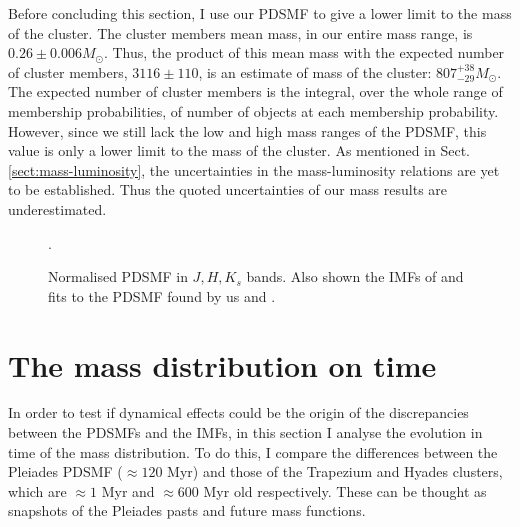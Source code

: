 Before concluding this section, I use our PDSMF to give a lower limit to the mass of the cluster. The cluster members mean mass, in our entire mass range, is $0.26 \pm 0.006 M_{\odot}$. Thus, the product of this mean mass with the expected number of cluster members, $3116 \pm 110$, is an estimate of mass of the cluster: $807^{+38}_{-29} M_{\odot}$. The expected number of cluster members is the integral, over the whole range of membership probabilities, of number of objects at each membership probability. However, since we still lack the low and high mass ranges of the PDSMF, this value is only a lower limit to the mass of the cluster. As mentioned in Sect. \ref{sect:mass-luminosity}, the uncertainties in the mass-luminosity relations are yet to be established. Thus the quoted uncertainties of our mass results are underestimated.

\begin{figure}[htbp]
\begin{center}
\caption{Normalised PDSMF in $J,H,K_s$ bands. Also shown the IMFs of \citet{Chabrier2005, Thies2007} and fits to the PDSMF found by us and \citet{Bouy2015}.}
\label{fig:MassFunction}.
\end{center}
\end{figure}

\section{The mass distribution on time}
In order to test if dynamical effects could be the origin of the discrepancies between the PDSMFs and the IMFs, in this section I analyse the evolution in time of the mass distribution. To do this, I compare the differences between the Pleiades PDSMF ($\approx120$ Myr) and those of the Trapezium and Hyades clusters, which  are $\approx1$ Myr and $\approx 600$ Myr old respectively. These can be thought as snapshots of the Pleiades pasts and future mass functions.  

